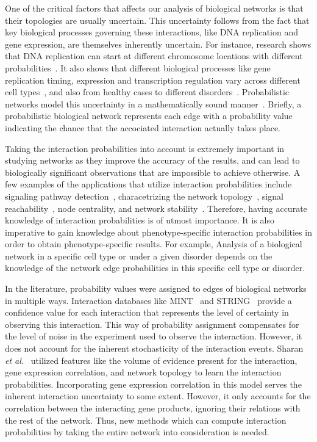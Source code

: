 \documentclass[runningheads,a4paper]{llncs}
\begin{document}
One of the critical factors that affects our analysis of biological networks is
that their topologies are usually uncertain. This uncertainty follows from the
fact that key biological processes governing these interactions, like DNA
replication and gene expression, are themselves inherently uncertain.
For instance, research shows that DNA replication can start at different
chromosome locations with different probabilities~\cite{missing}. It also shows that different
biological processes like gene replication timing, expression and
transcription regulation vary across different cell types~\cite{missing}, and
also from healthy cases to different disorders~\cite{missing}. Probabilistic
networks model this uncertainty in a mathematically sound manner~\cite{missing}.
Briefly, a probabilistic biological network represents each edge with a
probability value indicating the chance that the accociated interaction
actually takes place.

Taking the interaction probabilities into account is extremely important in
studying networks as they improve the accuracy of the results, and can lead to
biologically significant observations that are impossible to achieve otherwise.
A few examples of the applications that utilize interaction probabilities
include signaling pathway detection~\cite{missing}, characetrizing the network
topology~\cite{missing}, signal reachability~\cite{missing}, node centrality,
and network stability~\cite{missing}. Therefore, having accurate knowledge of
interaction probabilities is of utmost importance. It is also imperative to gain
knowledge about phenotype-specific interaction probabilities in order to obtain
phenotype-specific results. For example, Analysis of a biological network in a
specific cell type or under a given disorder depends on the knowledge of the
network edge probabilities in this specific cell type or disorder.

In the literature, probability values were assigned to edges of biological
networks in multiple ways. Interaction databases like MINT~\cite{missing} and 
STRING~\cite{missing} provide a confidence value for each interaction that
represents the level of certainty in observing this interaction. This way of
probability assignment compensates for the level of noise in the experiment used
to observe the interaction. However, it does not account for the inherent
stochasticity of the interaction events. Sharan {\it et al.}~\cite{log_reg}
utilized features like the volume of evidence present for the interaction, gene
expression correlation, and network topology to learn the interaction
probabilities. Incorporating gene expression correlation in this model serves
the inherent interaction uncertainty to some extent. However, it only accounts
for the correlation between the interacting gene products, ignoring their
relations with the rest of the network. Thus, new methods which can compute
interaction probabilities by taking the entire network into consideration is
needed.
\end{document}
